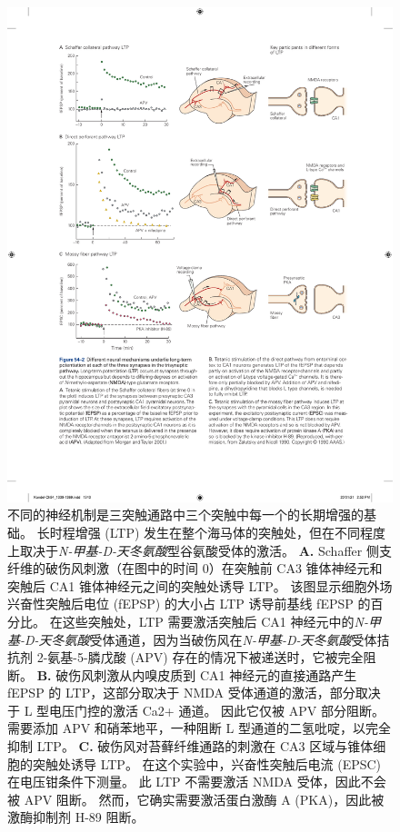 \begin{figure}[htbp]
	\centering
	\includegraphics[width=0.9\linewidth]{chap54/fig_54_2}
	\caption{不同的神经机制是三突触通路中三个突触中每一个的长期增强的基础。
		长时程增强 (LTP) 发生在整个海马体的突触处，但在不同程度上取决于\textit{N-甲基-D-天冬氨酸}型谷氨酸受体的激活。
		\textbf{A.} Schaffer 侧支纤维的破伤风刺激（在图中的时间 0）在突触前 CA3 锥体神经元和突触后 CA1 锥体神经元之间的突触处诱导 LTP。
		该图显示细胞外场兴奋性突触后电位 (fEPSP) 的大小占 LTP 诱导前基线 fEPSP 的百分比。
		在这些突触处，LTP 需要激活突触后 CA1 神经元中的\textit{N-甲基-D-天冬氨酸}受体通道，因为当破伤风在\textit{N-甲基-D-天冬氨酸}受体拮抗剂 2-氨基-5-膦戊酸 (APV) 存在的情况下被递送时，它被完全阻断\cite{morgan2001electrical}。
		\textbf{B.} 破伤风刺激从内嗅皮质到 CA1 神经元的直接通路产生 fEPSP 的 LTP，这部分取决于 NMDA 受体通道的激活，部分取决于 L 型电压门控的激活 Ca2+ 通道。 因此它仅被 APV 部分阻断。 需要添加 APV 和硝苯地平，一种阻断 L 型通道的二氢吡啶，以完全抑制 LTP。
		\textbf{C.} 破伤风对苔藓纤维通路的刺激在 CA3 区域与锥体细胞的突触处诱导 LTP。
		在这个实验中，兴奋性突触后电流 (EPSC) 在电压钳条件下测量。
		此 LTP 不需要激活 NMDA 受体，因此不会被 APV 阻断。
		然而，它确实需要激活蛋白激酶 A (PKA)，因此被激酶抑制剂 H-89 阻断\cite{zalutsky1990comparison}。}
	\label{fig:54_2}
\end{figure}


